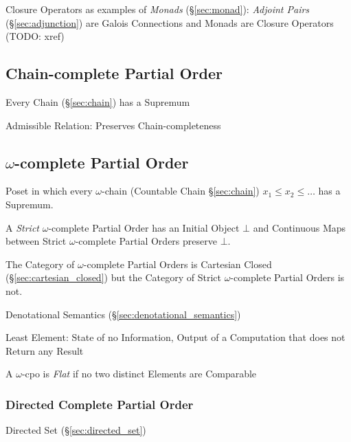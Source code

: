 Closure Operators as examples of \emph{Monads} (\S\ref{sec:monad}):
\emph{Adjoint Pairs} (\S\ref{sec:adjunction}) are Galois Connections and Monads
are Closure Operators (TODO: xref)



\subsection{Chain-complete Partial Order}\label{sec:cpo}

Every Chain (\S\ref{sec:chain}) has a Supremum

Admissible Relation: Preserves Chain-completeness



\subsection{$\omega$-complete Partial Order}\label{sec:omega_cpo}

Poset in which every $\omega$-chain (Countable Chain
\S\ref{sec:chain}) $x_1 \leq x_2 \leq \ldots$ has a Supremum.

A \emph{Strict} $\omega$-complete Partial Order has an Initial Object
$\bot$ and Continuous Maps between Strict $\omega$-complete Partial
Orders preserve $\bot$.

The Category of $\omega$-complete Partial Orders is Cartesian Closed
(\S\ref{sec:cartesian_closed}) but the Category of Strict
$\omega$-complete Partial Orders is not.

Denotational Semantics (\S\ref{sec:denotational_semantics})

Least Element: State of no Information, Output of a Computation that
does not Return any Result

A $\omega$-cpo is \emph{Flat} if no two distinct Elements are
Comparable



\subsubsection{Directed Complete Partial Order}\label{sec:dcpo}

Directed Set (\S\ref{sec:directed_set})

